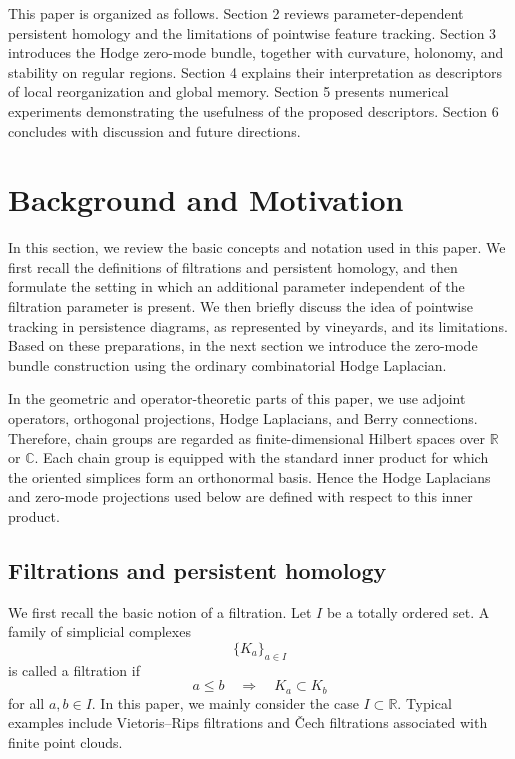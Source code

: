 \documentclass[pdflatex,sn-mathphys-num]{sn-jnl}%
\theoremstyle{thmstyleone}%
\theoremstyle{thmstyletwo}%
\theoremstyle{thmstylethree}%
\begin{document}
This paper is organized as follows. Section 2 reviews parameter-dependent persistent homology and the limitations of pointwise feature tracking. Section 3 introduces the Hodge zero-mode bundle, together with curvature, holonomy, and stability on regular regions. Section 4 explains their interpretation as descriptors of local reorganization and global memory. Section 5 presents numerical experiments demonstrating the usefulness of the proposed descriptors. Section 6 concludes with discussion and future directions.




\section{Background and Motivation}

In this section, we review the basic concepts and notation used in this paper. We first recall the definitions of filtrations and persistent homology, and then formulate the setting in which an additional parameter independent of the filtration parameter is present. We then briefly discuss the idea of pointwise tracking in persistence diagrams, as represented by vineyards, and its limitations. Based on these preparations, in the next section we introduce the zero-mode bundle construction using the ordinary combinatorial Hodge Laplacian.

In the geometric and operator-theoretic parts of this paper, we use adjoint operators, orthogonal projections, Hodge Laplacians, and Berry connections. Therefore, chain groups are regarded as finite-dimensional Hilbert spaces over \(\mathbb R\) or \(\mathbb C\). Each chain group is equipped with the standard inner product for which the oriented simplices form an orthonormal basis. Hence the Hodge Laplacians and zero-mode projections used below are defined with respect to this inner product.

\subsection{Filtrations and persistent homology}

We first recall the basic notion of a filtration. Let \(I\) be a totally ordered set. A family of simplicial complexes
\[
\{K_a\}_{a\in I}
\]
is called a filtration if
\[
a\le b \quad \Longrightarrow \quad K_a\subset K_b
\]
for all \(a,b\in I\). In this paper, we mainly consider the case \(I\subset\mathbb R\). Typical examples include Vietoris--Rips filtrations and \v{C}ech filtrations associated with finite point clouds.
\end{document}
